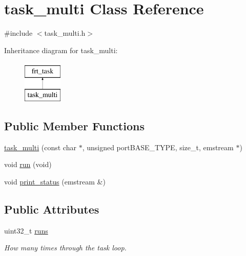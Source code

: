 \hypertarget{classtask__multi}{\section{task\+\_\+multi Class Reference}
\label{classtask__multi}
}


{\ttfamily \#include $<$task\+\_\+multi.\+h$>$}

Inheritance diagram for task\+\_\+multi\+:\begin{figure}[H]
\begin{center}
\leavevmode
\includegraphics[height=2.000000cm]{classtask__multi}
\end{center}
\end{figure}
\subsection*{Public Member Functions}
\begin{DoxyCompactItemize}
\item 
\hyperlink{classtask__multi_a218e8d171e30c27fbcb42da6917b5183}{task\+\_\+multi} (const char $\ast$, unsigned port\+B\+A\+S\+E\+\_\+\+T\+Y\+P\+E, size\+\_\+t, emstream $\ast$)
\item 
void \hyperlink{classtask__multi_a66f62aa64889850eca87e1504c604fc8}{run} (void)
\item 
void \hyperlink{classtask__multi_a1151df7d6a9db246951be2f12e1f9698}{print\+\_\+status} (emstream \&)
\end{DoxyCompactItemize}
\subsection*{Public Attributes}
\begin{DoxyCompactItemize}
\item 
\hypertarget{classtask__multi_a6baa00e27d51096a455f2f4c7b5f4006}{uint32\+\_\+t \hyperlink{classtask__multi_a6baa00e27d51096a455f2f4c7b5f4006}{runs}}\label{classtask__multi_a6baa00e27d51096a455f2f4c7b5f4006}

\begin{DoxyCompactList}\small\item\em How many times through the task loop. \end{DoxyCompactList}\end{DoxyCompactItemize}


